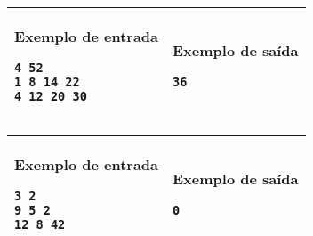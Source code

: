 \begin{table}[!h]
\centering
\begin{tabular}{|l|l|}
\hline
\begin{minipage}[t]{3in}
\textbf{Exemplo de entrada}
\begin{verbatim}
4 52
1 8 14 22
4 12 20 30
\end{verbatim}
\vspace{1mm}
\end{minipage}
&

\begin{minipage}[t]{3in}
\textbf{Exemplo de saída}
\begin{verbatim}
36
\end{verbatim}
\vspace{1mm}
\end{minipage} \\
\hline
\end{tabular}
\end{table}

\begin{table}[!h]
\centering
\begin{tabular}{|l|l|}
\hline
\begin{minipage}[t]{3in}
\textbf{Exemplo de entrada}
\begin{verbatim}
3 2
9 5 2
12 8 42
\end{verbatim}
\vspace{1mm}
\end{minipage}
&

\begin{minipage}[t]{3in}
\textbf{Exemplo de saída}
\begin{verbatim}
0
\end{verbatim}
\vspace{1mm}
\end{minipage} \\
\hline
\end{tabular}
\end{table}
